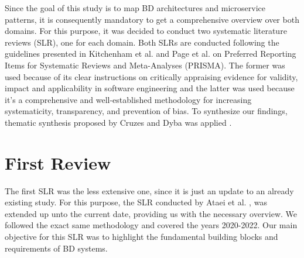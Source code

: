 \documentclass[a4paper,11pt,article,oneside]{memoir}
\begin{document}
Since the goal of this study is to map BD architectures and microservice patterns, it is consequently mandatory to get a comprehensive overview over both domains. For this purpose, it was decided to conduct two systematic literature reviews (SLR), one for each domain. Both SLRs are conducted following the guidelines presented in Kitchenham et al. \cite{Kitchenham.2004} and Page et al. \cite{Page.2021} on Preferred Reporting Items for Systematic Reviews and Meta-Analyses (PRISMA). The former was used because of its clear instructions on critically appraising evidence for validity, impact and applicability in software engineering and the latter was used because it's a comprehensive and well-established methodology for increasing systematicity, transparency, and prevention of bias. To synthesize our findings, thematic synthesis proposed by Cruzes and Dyba was applied \cite{Cruzes.2011}. 







\section{First Review}

The first SLR was the less extensive one, since it is just an update to an already existing study. For this purpose, the SLR conducted by Ataei et al. \cite{Ataei.2020}, was extended up unto the current date, providing us with the necessary overview. We followed the exact same methodology and covered the years 2020-2022. Our main objective for this SLR was to highlight the fundamental building blocks and requirements of BD systems. 
\end{document}
